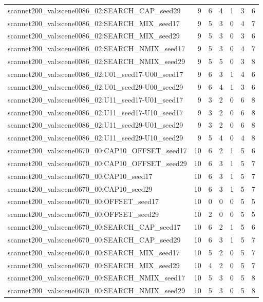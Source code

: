 \begin{table}[t]
\begin{tabular}{lrrrrrr}
scannet200\_val:scene0086\_02:SEARCH\_CAP\_seed29 & 9 & 6 & 4 & 1 & 3 & 6 \\
scannet200\_val:scene0086\_02:SEARCH\_MIX\_seed17 & 9 & 5 & 3 & 0 & 4 & 7 \\
scannet200\_val:scene0086\_02:SEARCH\_MIX\_seed29 & 9 & 5 & 3 & 0 & 3 & 6 \\
scannet200\_val:scene0086\_02:SEARCH\_NMIX\_seed17 & 9 & 5 & 3 & 0 & 4 & 7 \\
scannet200\_val:scene0086\_02:SEARCH\_NMIX\_seed29 & 9 & 5 & 5 & 0 & 3 & 8 \\
scannet200\_val:scene0086\_02:U01\_seed17-U00\_seed17 & 9 & 6 & 3 & 1 & 4 & 6 \\
scannet200\_val:scene0086\_02:U01\_seed29-U00\_seed29 & 9 & 6 & 4 & 1 & 3 & 6 \\
scannet200\_val:scene0086\_02:U11\_seed17-U01\_seed17 & 9 & 3 & 2 & 0 & 6 & 8 \\
scannet200\_val:scene0086\_02:U11\_seed17-U10\_seed17 & 9 & 3 & 2 & 0 & 6 & 8 \\
scannet200\_val:scene0086\_02:U11\_seed29-U01\_seed29 & 9 & 3 & 2 & 0 & 6 & 8 \\
scannet200\_val:scene0086\_02:U11\_seed29-U10\_seed29 & 9 & 5 & 4 & 0 & 4 & 8 \\
scannet200\_val:scene0670\_00:CAP10\_OFFSET\_seed17 & 10 & 6 & 2 & 1 & 5 & 6 \\
scannet200\_val:scene0670\_00:CAP10\_OFFSET\_seed29 & 10 & 6 & 3 & 1 & 5 & 7 \\
scannet200\_val:scene0670\_00:CAP10\_seed17 & 10 & 6 & 3 & 1 & 5 & 7 \\
scannet200\_val:scene0670\_00:CAP10\_seed29 & 10 & 6 & 3 & 1 & 5 & 7 \\
scannet200\_val:scene0670\_00:OFFSET\_seed17 & 10 & 0 & 0 & 0 & 5 & 5 \\
scannet200\_val:scene0670\_00:OFFSET\_seed29 & 10 & 2 & 0 & 0 & 5 & 5 \\
scannet200\_val:scene0670\_00:SEARCH\_CAP\_seed17 & 10 & 6 & 2 & 1 & 5 & 6 \\
scannet200\_val:scene0670\_00:SEARCH\_CAP\_seed29 & 10 & 6 & 3 & 1 & 5 & 7 \\
scannet200\_val:scene0670\_00:SEARCH\_MIX\_seed17 & 10 & 5 & 2 & 0 & 5 & 7 \\
scannet200\_val:scene0670\_00:SEARCH\_MIX\_seed29 & 10 & 4 & 2 & 0 & 5 & 7 \\
scannet200\_val:scene0670\_00:SEARCH\_NMIX\_seed17 & 10 & 5 & 3 & 0 & 5 & 8 \\
scannet200\_val:scene0670\_00:SEARCH\_NMIX\_seed29 & 10 & 5 & 3 & 0 & 5 & 8 \\

\end{tabular}
\end{table}
